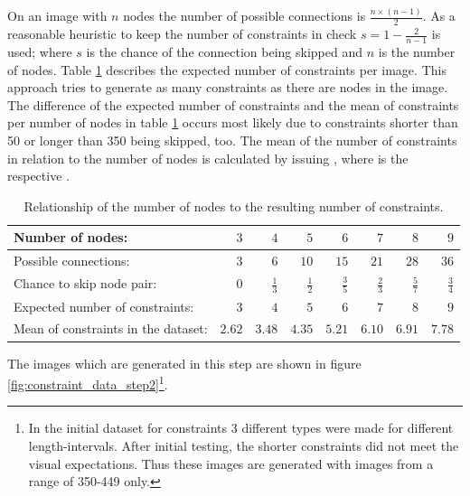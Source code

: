 On an image with $n$ nodes the number of possible connections is $\frac{n \times (n-1)}{2}$.
As a reasonable heuristic to keep the number of constraints in check $s = 1 - \frac{2}{n-1}$ is used; where $s$ is the chance of the connection being skipped and $n$ is the number of nodes.
Table \ref{tab:relation_nodes_constraints} describes the expected number of constraints per image.
This approach tries to generate as many constraints as there are nodes in the image.
The difference of the expected number of constraints and the mean of constraints per number of nodes in table \ref{tab:relation_nodes_constraints} occurs most likely due to constraints shorter than 50 or longer than 350 being skipped, too.
The mean of the number of constraints in relation to the number of nodes is calculated by issuing , where  is the respective .

\begin{table}
\caption{Relationship of the number of nodes to the resulting number of constraints.}
\label{tab:relation_nodes_constraints}
\begin{tabular}{lrrrrrrr}
    \toprule
    Number of nodes: & $3$ & $4$ & $5$ & $6$ & $7$ & $8$ & $9$ \\
    \midrule
    Possible connections: & $3$ & $6$ & $10$ & $15$ & $21$ & $28$ & $36$ \\
    \midrule
    Chance to skip node pair: & $0$ & $\frac{1}{3}$ & $\frac{1}{2}$ & $\frac{3}{5}$ & $\frac{2}{3}$ & $\frac{5}{7}$ & $\frac{3}{4}$ \\
    \midrule
    Expected number of constraints: & $3$ & $4$ & $5$ & $6$ & $7$ & $8$ & $9$ \\
    \midrule
    Mean of constraints in the dataset: & $2.62$ & $3.48$ & $4.35$ & $5.21$ & $6.10$ & $6.91$ & $7.78$ \\
    \bottomrule
\end{tabular}
\end{table}

The images which are generated in this step are shown in figure \ref{fig:constraint_data_step2}\footnote{In the initial dataset for constraints 3 different types were made for different length-intervals. After initial testing, the shorter constraints did not meet the visual expectations. Thus these images are generated with images from a range of 350-449 only.}.

